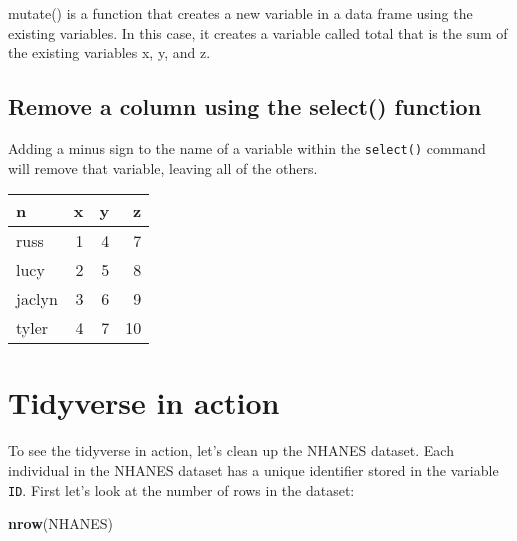 \documentclass[12pt,]{book}
\newenvironment{Shaded}{\begin{snugshade}}{\end{snugshade}}
\newcommand{\KeywordTok}[1]{\textcolor[rgb]{0.13,0.29,0.53}{\textbf{#1}}}
\newcommand{\NormalTok}[1]{#1}
\newcommand{\OperatorTok}[1]{\textcolor[rgb]{0.81,0.36,0.00}{\textbf{#1}}}
\newcommand{\StringTok}[1]{\textcolor[rgb]{0.31,0.60,0.02}{#1}}
\begin{document}
mutate() is a function that creates a new variable in a data frame using the existing variables. In this case, it creates a variable called total that is the sum of the existing variables x, y, and z.

\hypertarget{remove-a-column-using-the-select-function}{%
\subsection{Remove a column using the select() function}\label{remove-a-column-using-the-select-function}}

Adding a minus sign to the name of a variable within the \texttt{select()} command will remove that variable, leaving all of the others.

\begin{Shaded}
\end{Shaded}

\begin{tabular}{l|r|r|r}
\hline
n & x & y & z\\
\hline
russ & 1 & 4 & 7\\
\hline
lucy & 2 & 5 & 8\\
\hline
jaclyn & 3 & 6 & 9\\
\hline
tyler & 4 & 7 & 10\\
\hline
\end{tabular}

\hypertarget{tidyverse-in-action}{%
\section{Tidyverse in action}\label{tidyverse-in-action}}

To see the tidyverse in action, let's clean up the NHANES dataset. Each individual in the NHANES dataset has a unique identifier stored in the variable \texttt{ID}. First let's look at the number of rows in the dataset:

\begin{Shaded}
\begin{Highlighting}[]
\KeywordTok{nrow}\NormalTok{(NHANES)}
\end{Highlighting}
\end{Shaded}
\end{document}
